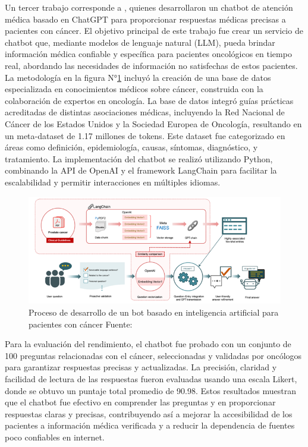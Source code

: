 Un tercer trabajo corresponde a \parencite{lee2024}, quienes desarrollaron un chatbot de atención médica basado en ChatGPT para proporcionar respuestas médicas precisas a pacientes con cáncer. El objetivo principal de este trabajo fue crear un servicio de chatbot que, mediante modelos de lenguaje natural (LLM), pueda brindar información médica confiable y específica para pacientes oncológicos en tiempo real, abordando las necesidades de información no satisfechas de estos pacientes.
La metodología en la figura N°\ref{9:fig} incluyó la creación de una base de datos especializada en conocimientos médicos sobre cáncer, construida con la colaboración de expertos en oncología. La base de datos integró guías prácticas acreditadas de distintas asociaciones médicas, incluyendo la Red Nacional de Cáncer de los Estados Unidos y la Sociedad Europea de Oncología, resultando en un meta-dataset de 1.17 millones de tokens. Este dataset fue categorizado en áreas como definición, epidemiología, causas, síntomas, diagnóstico, y tratamiento. La implementación del chatbot se realizó utilizando Python, combinando la API de OpenAI y el framework LangChain para facilitar la escalabilidad y permitir interacciones en múltiples idiomas.

\begin{figure}[ht]
	\centering
	\includegraphics[width=\textwidth]{2/figures/BOT IA.png}
	\caption{Proceso de desarrollo de un bot basado en inteligencia artificial para pacientes con cáncer Fuente: \cite{lee2024}}
	\label{9:fig}
\end{figure}
Para la evaluación del rendimiento, el chatbot fue probado con un conjunto de 100 preguntas relacionadas con el cáncer, seleccionadas y validadas por oncólogos para garantizar respuestas precisas y actualizadas. La precisión, claridad y facilidad de lectura de las respuestas fueron evaluadas usando una escala Likert, donde se obtuvo un puntaje total promedio de 90.98. Estos resultados muestran que el chatbot fue efectivo en comprender las preguntas y en proporcionar respuestas claras y precisas, contribuyendo así a mejorar la accesibilidad de los pacientes a información médica verificada y a reducir la dependencia de fuentes poco confiables en internet.

